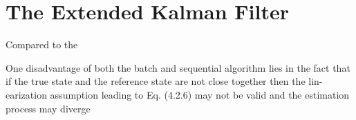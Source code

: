 \section{The Extended Kalman Filter}\label{sec:pod-extended-kalman-filter}

Compared to the 

One disadvantage of both the batch and sequential algorithm lies in the fact
that if the true state and the reference state are not close together then the lin-
earization assumption leading to Eq. (4.2.6) may not be valid and the estimation
process may diverge